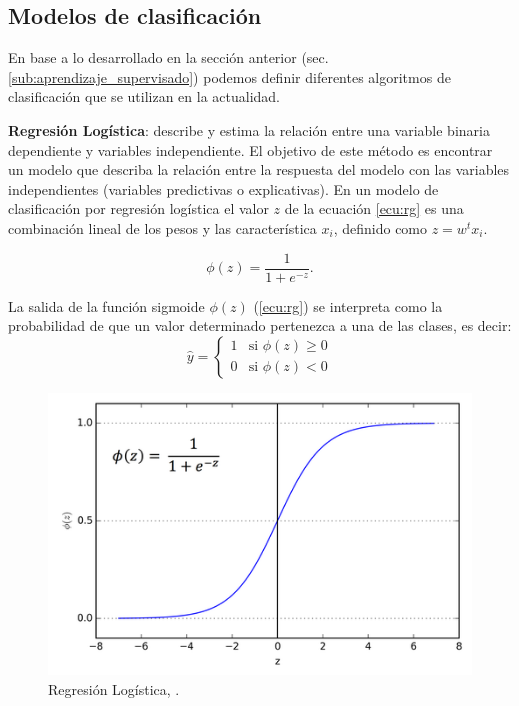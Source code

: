 \subsection{Modelos de clasificación}\label{sub:clasificadores}

En base a lo desarrollado en la sección anterior (sec.\ref{sub:aprendizaje_supervisado}) podemos definir diferentes algoritmos de clasificación que se utilizan en la actualidad.

\par \textbf{Regresión Logística}: describe y estima la relación entre una variable binaria dependiente y variables independiente. El objetivo de este método es encontrar un modelo que describa la relación entre la respuesta del modelo con las variables independientes (variables predictivas o explicativas). En un modelo de clasificación por regresión logística el valor $z$ de la ecuación \ref {ecu:rg} es una combinación lineal de los pesos y las característica $x_i$, definido como $z=w^t x_i$. 
   

\begin{equation}\label{ecu:rg}
\phi(z) = \frac{1}{1+e^{-z}}.
\end{equation}

La salida de la función sigmoide $\phi(z)$ (\ref {ecu:rg}) se interpreta como la probabilidad de que un valor determinado pertenezca a una de las clases, es decir:
\begin{equation}\label{ecu:f_sig_class}
\hat{y} = \left \{\begin{matrix} 1 & \mbox{si }\phi(z) \ge 0
\\ 0 & \mbox{si }\phi(z) < 0 \end{matrix}\right. 
\end{equation}


\begin{figure}[H]
 \centering
  \includegraphics[scale=0.5]{imagenes/MarcoTeorico/sigmoide.png}
  \caption{Regresión Logística, \citep{bishop}.}
  \label{Fig: log_reg}
\end{figure}


